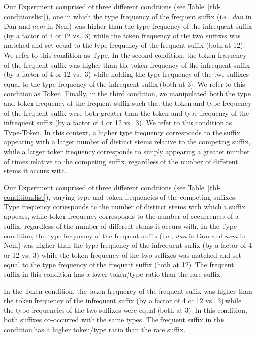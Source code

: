 \documentclass[
  letterpaper,
  DIV=11,
  numbers=noendperiod]{scrartcl}
\begin{document}
Our Experiment comprised of three different conditions (see
Table~\ref{tbl-conditionslist}), one in which the type frequency of the
frequent suffix (i.e., \emph{dan} in Dan and \emph{nem} in Nem) was
higher than the type frequency of the infrequent suffix (by a factor of
4 or 12 vs.~3) while the token frequency of the two suffixes was matched
and set equal to the type frequency of the frequent suffix (both at 12).
We refer to this condition as Type. In the second condition, the token
frequency of the frequent suffix was higher than the token frequency of
the infrequent suffix (by a factor of 4 or 12 vs.~3) while holding the
type frequency of the two suffixes equal to the type frequency of the
infrequent suffix (both at 3). We refer to this condition as Token.
Finally, in the third condition, we manipulated both the type and token
frequency of the frequent suffix such that the token and type frequency
of the frequent suffix were both greater than the token and type
frequency of the infrequent suffix (by a factor of 4 or 12 vs.~3). We
refer to this condition as Type-Token. In this context, a higher type
frequency corresponds to the suffix appearing with a larger number of
distinct stems relative to the competing suffix, while a larger token
frequency corresponds to simply appearing a greater number of times
relative to the competing suffix, regardless of the number of different
stems it occurs with.

Our Experiment comprised of three different conditions (see
Table~\ref{tbl-conditionslist}), varying type and token frequencies of
the competing suffixes. Type frequency corresponds to the number of
distinct stems with which a suffix appears, while token frequency
corresponds to the number of occurrences of a suffix, regardless of the
number of different stems it occurs with. In the Type condition, the
type frequency of the frequent suffix (i.e., \emph{dan} in Dan and
\emph{nem} in Nem) was higher than the type frequency of the infrequent
suffix (by a factor of 4 or 12 vs.~3) while the token frequency of the
two suffixes was matched and set equal to the type frequency of the
frequent suffix (both at 12). The frequent suffix in this condition has
a lower token/type ratio than the rare suffix.

In the Token condition, the token frequency of the frequent suffix was
higher than the token frequency of the infrequent suffix (by a factor of
4 or 12 vs.~3) while the type frequencies of the two suffixes were equal
(both at 3). In this condition, both suffixes co-occurred with the same
types. The frequent suffix in this condition has a higher token/type
ratio than the rare suffix.
\end{document}
